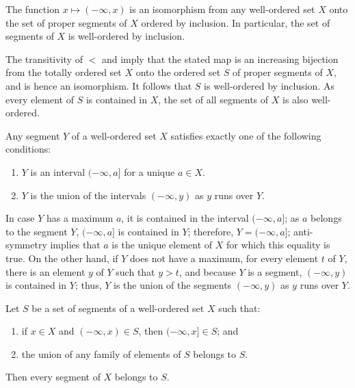 \documentclass{article}
\begin{document}
\begin{theorem}
  \label{thm:b4yv5x3a}
  The function \(x \mapsto (-\infty, x)\) is an isomorphism from any
  well-ordered set \(X\) onto the set of proper segments of \(X\)
  ordered by inclusion.  In particular, the set of segments of \(X\)
  is well-ordered by inclusion.
\end{theorem}

The transitivity of \(<\) and  imply that the
stated map is an increasing bijection from the totally ordered set
\(X\) onto the ordered set \(S\) of proper segments of \(X\), and is
hence an isomorphism.  It follows that \(S\) is well-ordered by
inclusion.  As every element of \(S\) is contained in \(X\), the set
of all segments of \(X\) is also well-ordered.

\begin{theorem}
  \label{thm:36vndfrs}
  Any segment \(Y\) of a well-ordered set \(X\) satisfies exactly one
  of the following conditions:
  \begin{enumerate}
  \item \(Y\) is an interval \((-\infty, a]\) for a unique
    \(a \in X\).
  \item \(Y\) is the union of the intervals \((-\infty, y)\) as \(y\)
    runs over \(Y\).
  \end{enumerate}
\end{theorem}

In case \(Y\) has a maximum \(a\), it is contained in the interval
\((-\infty, a]\); as \(a\) belongs to the segment \(Y\),
\((-\infty, a]\) is contained in \(Y\); therefore,
\(Y = (-\infty, a]\); anti-symmetry implies that \(a\) is the unique
element of \(X\) for which this equality is true.  On the other hand,
if \(Y\) does not have a maximum, for every element \(t\) of \(Y\),
there is an element \(y\) of \(Y\) such that \(y > t\), and because
\(Y\) is a segment, \((-\infty, y)\) is contained in \(Y\); thus,
\(Y\) is the union of the segments \((-\infty, y)\) as \(y\) runs over
\(Y\).

\begin{theorem}
  \label{thm:y3go6w2h}
  Let \(S\) be a set of segments of a well-ordered set \(X\) such
  that:
  \begin{enumerate}
  \item if \(x \in X\) and \((-\infty, x) \in S\), then
    \((-\infty, x] \in S\); and
  \item the union of any family of elements of \(S\) belongs to \(S\).
  \end{enumerate}
  Then every segment of \(X\) belongs to \(S\).
\end{theorem}
\end{document}
